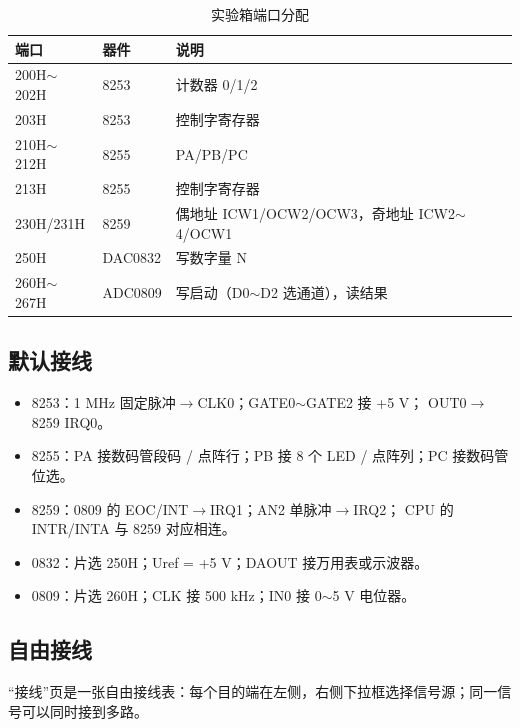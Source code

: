 \documentclass[11pt,a4paper]{ctexart}
\begin{document}
\begin{table}[H]
\centering
\small
\begin{tabularx}{0.92\textwidth}{>{\ttfamily}l l X}
\toprule
端口 & 器件 & 说明 \\
\midrule
200H$\sim$202H & 8253 & 计数器 0/1/2 \\
203H & 8253 & 控制字寄存器 \\
210H$\sim$212H & 8255 & PA/PB/PC \\
213H & 8255 & 控制字寄存器 \\
230H/231H & 8259 & 偶地址 ICW1/OCW2/OCW3，奇地址 ICW2$\sim$4/OCW1 \\
250H & DAC0832 & 写数字量 N \\
260H$\sim$267H & ADC0809 & 写启动（D0$\sim$D2 选通道），读结果 \\
\bottomrule
\end{tabularx}
\caption{实验箱端口分配}
\end{table}

\subsection{默认接线}

\begin{itemize}
  \item 8253：1 MHz 固定脉冲$\rightarrow$CLK0；GATE0$\sim$GATE2 接 +5 V；
        OUT0$\rightarrow$8259 IRQ0。
  \item 8255：PA 接数码管段码 / 点阵行；PB 接 8 个 LED / 点阵列；PC 接数码管位选。
  \item 8259：0809 的 EOC/INT$\rightarrow$IRQ1；AN2 单脉冲$\rightarrow$IRQ2；
        CPU 的 INTR/INTA 与 8259 对应相连。
  \item 0832：片选 250H；Uref = +5 V；DAOUT 接万用表或示波器。
  \item 0809：片选 260H；CLK 接 500 kHz；IN0 接 0$\sim$5 V 电位器。
\end{itemize}

\subsection{自由接线}

“接线”页是一张自由接线表：每个目的端在左侧，右侧下拉框选择信号源；同一信号可以同时接到多路。
\end{document}
